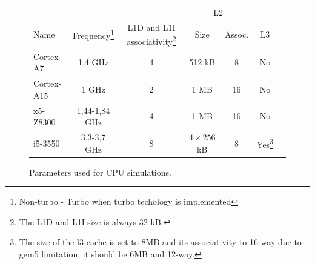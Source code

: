 \documentclass{article}
\begin{document}
\begin{figure}[ht]
\begin{center}

\begin{tabular}{| l | c | c | c | c | c | c |}
\hline 
& & & \multicolumn{2}{c|}{L2} &\\
Name & Frequency\footnote{Non-turbo - Turbo when turbo techology is implemented} & L1D and L1I associativity\footnote{The L1D and L1I size is always 32 kB.} & Size & Assoc. & L3 \\
\hline
Cortex-A7 & 1,4 GHz & 4 & 512 kB & 8 & No \\
Cortex-A15 & 1 GHz & 2 & 1 MB & 16 & No \\
x5-Z8300 & 1,44-1,84 GHz & 4 & 1 MB & 16 & No \\
i5-3550 & 3,3-3,7 GHz & 8 & $4 \times 256$ kB & 8 & Yes\footnote{The size of the l3 cache is set to 8MB and its associativity to 16-way due to gem5 limitation, it should be 6MB and 12-way.}\\
\hline

\end{tabular}
\caption{\label{cpu_setup}Parameters used for CPU simulations.}
\end{center}
\end{figure}
\end{document}
